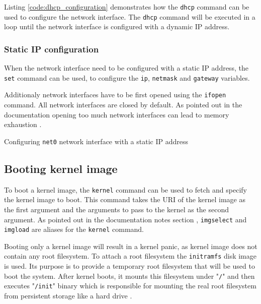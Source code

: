 \documentclass[../main.tex]{subfiles}
\begin{document}
Listing \ref{code:dhcp_configuration} demonstrates how the \texttt{dhcp} command can be used to configure the network interface.
The \texttt{dhcp} command will be executed in a loop until the network interface is configured with a dynamic IP address.

\subsubsection{Static IP configuration}

When the network interface need to be configured with a static IP address, the \texttt{set} command can be used,
to configure the \texttt{ip}, \texttt{netmask} and \texttt{gateway} variables.


Additionaly network interfaces have to be first opened using the \texttt{ifopen} command.
All network interfaces are closed by default. As pointed out in the documentation opening too much network interfaces can lead to memory exhaustion \cite{ipxe_opening_interfaces}.

\begin{listing}[H]
  \caption{Configuring \texttt{net0} network interface with a static IP address}
  \label{code:static_ip_configuration}
\end{listing}

\subsection{Booting kernel image}

To boot a kernel image, the \texttt{kernel} command can be used to fetch and specify the kernel image to boot.
This command takes the URI of the kernel image as the first argument and the arguments to pass to the kernel as the second argument.
As pointed out in the documentation notes section \cite{ipxe_kernel_command}, \texttt{imgselect} and \texttt{imgload} are aliases for the \texttt{kernel} command.

Booting only a kernel image will result in a kernel panic, as kernel image does not contain any root filesystem.
To attach a root filesystem the \texttt{initramfs} disk image is used. Its purpose is to provide a temporary root filesystem that will be used to boot the system.
After kernel boots, it mounts this filesystem under  "\texttt{/}" and then executes "\texttt{/init}" binary which is responsible for mounting the real root filesystem from persistent storage like a hard drive \cite{initramfs_purpose}.
\end{document}
